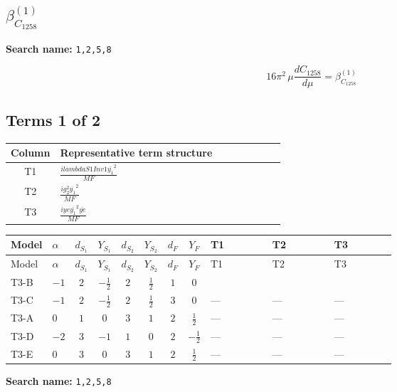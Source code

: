 \documentclass[8pt]{article}
\begin{document}
\begin{landscape}
\section*{$\beta_{C_{1258}}^{(1)}$}
\noindent\textbf{Search name: }\texttt{1,2,5,8}\par\smallskip
\[16\pi^2\,\mu\frac{d C_{1258}}{d\mu}=\beta_{C_{1258}}^{(1)}\]
\subsection*{Terms 1 of 2}
\begin{center}
\begin{tabular}{@{}c >{\raggedright\arraybackslash}p{0.82\linewidth}@{}}
\toprule
Column & Representative term structure \\
\midrule
T1 & \(\displaystyle \frac{i lambdaS1Inv1 \overline{y_{1}}^{2}}{MF}\) \\
\midrule
T2 & \(\displaystyle \frac{i g_{2}^{2} \overline{y_{1}}^{2}}{MF}\) \\
\midrule
T3 & \(\displaystyle \frac{i ye \overline{y_{1}}^{2} \overline{ye}}{MF}\) \\
\midrule
\bottomrule
\end{tabular}
\end{center}
\smallskip
\tiny
\begin{longtable}{@{}llcccccc >{\raggedright\arraybackslash}p{0.21\linewidth} >{\raggedright\arraybackslash}p{0.21\linewidth} >{\raggedright\arraybackslash}p{0.21\linewidth}@{}}
\toprule
Model & $\alpha$ & $d_{S_1}$ & $Y_{S_1}$ & $d_{S_2}$ & $Y_{S_2}$ & $d_F$ & $Y_F$ & T1 & T2 & T3 \\
\midrule
\endfirsthead
\toprule
Model & $\alpha$ & $d_{S_1}$ & $Y_{S_1}$ & $d_{S_2}$ & $Y_{S_2}$ & $d_F$ & $Y_F$ & T1 & T2 & T3 \\
\midrule
\endhead
T3-B & $-1$ & $2$ & $-\frac{1}{2}$ & $2$ & $\frac{1}{2}$ & $1$ & $0$ & \scriptsize\adjustbox{max width=\linewidth}{$\begin{gathered} \frac{i lambdaS1Inv1 \overline{y_{1}}^{2}}{4 MF}\end{gathered}$} & \scriptsize\adjustbox{max width=\linewidth}{$\begin{gathered} \frac{3 i g_{2}^{2} \overline{y_{1}}^{2}}{8 MF}\end{gathered}$} & \scriptsize\adjustbox{max width=\linewidth}{$\begin{gathered} - \frac{i ye \overline{y_{1}}^{2} \overline{ye}}{8 MF}\end{gathered}$} \\
\midrule
T3-C & $-1$ & $2$ & $-\frac{1}{2}$ & $2$ & $\frac{1}{2}$ & $3$ & $0$ & --- & --- & --- \\
\midrule
T3-A & $0$ & $1$ & $0$ & $3$ & $1$ & $2$ & $\frac{1}{2}$ & --- & --- & --- \\
\midrule
T3-D & $-2$ & $3$ & $-1$ & $1$ & $0$ & $2$ & $-\frac{1}{2}$ & --- & --- & --- \\
\midrule
T3-E & $0$ & $3$ & $0$ & $3$ & $1$ & $2$ & $\frac{1}{2}$ & --- & --- & --- \\
\midrule
\bottomrule
\end{longtable}
\clearpage
\noindent\textbf{Search name: }\texttt{1,2,5,8}\par\smallskip

\end{landscape}
\end{document}
